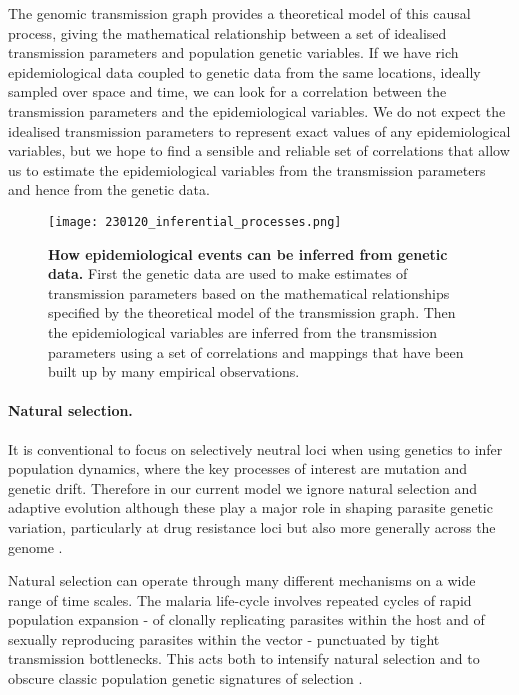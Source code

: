 \documentclass[_main.tex]{subfiles}
\begin{document}
The genomic transmission graph provides a theoretical model of this causal process, giving the mathematical relationship between a set of idealised transmission parameters and population genetic variables.  If we have rich epidemiological data coupled to genetic data from the same locations, ideally sampled over space and time, we can look for a correlation between the transmission parameters and the epidemiological variables.  We do not expect the idealised transmission parameters to represent exact values of any epidemiological variables, but we hope to find a sensible and reliable set of correlations that allow us to estimate the epidemiological variables from the transmission parameters and hence from the genetic data. 

\begin{figure}[h!]
\centering
\texttt{[image: 230120\_inferential\_processes.png]}
\caption{\textbf{How epidemiological events can be inferred from genetic data.}  First the genetic data are used to make estimates of transmission parameters based on the mathematical relationships specified by the theoretical model of the transmission graph.  Then the epidemiological variables are inferred from the transmission parameters using a set of correlations and mappings that have been built up by many empirical observations.}
\label{fig:epi_mapping}
\end{figure}

\paragraph{Natural selection.}  It is conventional to focus on selectively neutral loci when using genetics to infer population dynamics, where the key processes of interest are mutation and genetic drift.   Therefore in our current model we ignore natural selection and adaptive evolution although these play a major role in shaping parasite genetic variation, particularly at drug resistance loci but also more generally across the genome \cite{Anderson2017,Amato2018,Band2022}.   

Natural selection can operate through many different mechanisms on a wide range of time scales.  The malaria life-cycle involves repeated cycles of rapid population expansion - of clonally replicating parasites within the host and of sexually reproducing parasites within the vector - punctuated by tight transmission bottlenecks.  This acts both to intensify natural selection and to obscure classic population genetic signatures of selection \cite{Chan2013,Chang2015}.  
\end{document}
